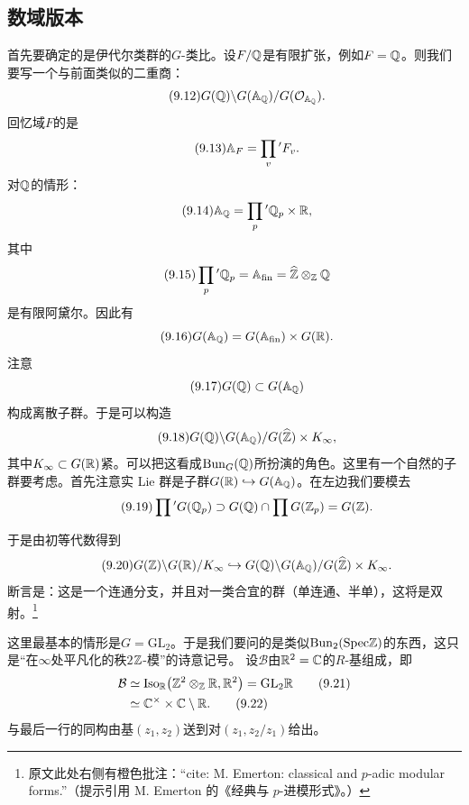 \subsection*{数域版本}
首先要确定的是伊代尔类群的$G$-类比。设$F/\mathbb{Q}$是有限扩张，例如$F=\mathbb{Q}$。则我们要写一个与前面类似的二重商：
\begin{equation}\tag{9.12}
G(\mathbb{Q})\backslash G(\mathbb{A}_{\mathbb{Q}})/G(\mathcal{O}_{\mathbb{A}_{\mathbb{Q}}}).
\end{equation}
回忆域$F$的是
\begin{equation}\tag{9.13}
\mathbb{A}_F=\prod_{v}{}^{\prime}F_v.
\end{equation}
对$\mathbb{Q}$的情形：
\begin{equation}\tag{9.14}
\mathbb{A}_{\mathbb{Q}}=\prod_{p}{}^{\prime}\mathbb{Q}_p\times\mathbb{R},
\end{equation}
其中
\begin{equation}\tag{9.15}
\prod_{p}{}^{\prime}\mathbb{Q}_p=\mathbb{A}_{\mathrm{fin}}=\widehat{\mathbb{Z}}\otimes_{\mathbb{Z}}\mathbb{Q}
\end{equation}
是有限阿黛尔。因此有
\begin{equation}\tag{9.16}
G(\mathbb{A}_{\mathbb{Q}})=G(\mathbb{A}_{\mathrm{fin}})\times G(\mathbb{R}).
\end{equation}
注意
\begin{equation}\tag{9.17}
G(\mathbb{Q})\subset G(\mathbb{A}_{\mathbb{Q}})
\end{equation}
构成离散子群。于是可以构造
\begin{equation}\tag{9.18}
G(\mathbb{Q})\backslash G(\mathbb{A}_{\mathbb{Q}})/G(\widehat{\mathbb{Z}})\times K_\infty,
\end{equation}
其中$K_\infty\subset G(\mathbb{R})$紧。可以把这看成$\mathrm{Bun}_G(\mathbb{Q})$所扮演的角色。这里有一个自然的子群要考虑。首先注意实 Lie 群是子群$G(\mathbb{R})\hookrightarrow G(\mathbb{A}_{\mathbb{Q}})$。在左边我们要模去
\begin{equation}\tag{9.19}
\prod{}^{\prime}G(\mathbb{Q}_p)\supset G(\mathbb{Q})\cap\prod G(\mathbb{Z}_p)=G(\mathbb{Z}).
\end{equation}

于是由初等代数得到
\begin{equation}\tag{9.20}
G(\mathbb{Z})\backslash G(\mathbb{R})/K_\infty\hookrightarrow G(\mathbb{Q})\backslash G(\mathbb{A}_{\mathbb{Q}})/G(\widehat{\mathbb{Z}})\times K_\infty.
\end{equation}
断言是：这是一个连通分支，并且对一类合宜的群（单连通、半单），这将是双射。\footnote{原文此处右侧有橙色批注：“cite: M. Emerton: classical and $p$-adic modular forms.”（提示引用 M. Emerton 的《经典与 $p$-进模形式》。）}

这里最基本的情形是$G=\mathrm{GL}_2$。于是我们要问的是类似$\mathrm{Bun}_2(\mathrm{Spec}\mathbb{Z})$的东西，这只是“在$\infty$处平凡化的秩$2$$\mathbb{Z}$-模”的诗意记号。
设$\mathcal B$由$\mathbb{R}^{2}=\mathbb{C}$的$R$-基组成，即
\begin{align}
\mathcal B&\simeq\mathrm{Iso}_{\mathbb{R}}\bigl(\mathbb{Z}^{2}\otimes_{\mathbb{Z}}\mathbb{R},\mathbb{R}^{2}\bigr)=\mathrm{GL}_2\mathbb{R}\tag{9.21}\\
&\simeq\mathbb{C}^{\times}\times\mathbb{C}\setminus\mathbb{R}.\tag{9.22}
\end{align}
与最后一行的同构由基$(z_1,z_2)$送到对$(z_1,z_2/z_1)$给出。

